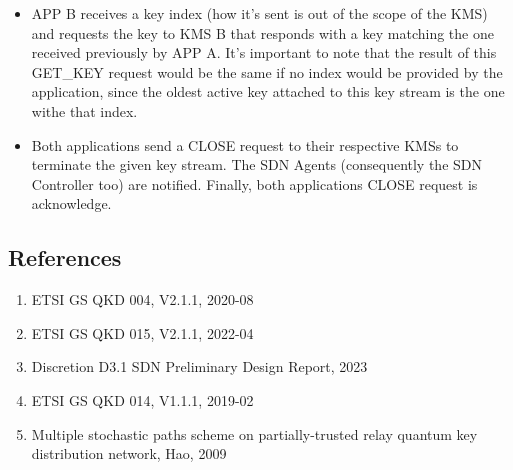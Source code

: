 \begin{refsection}
\begin{itemize}
 	\item APP B receives a key index (how it's sent is out of the scope of the \ac{KMS}) and requests the key to \ac{KMS} B that responds with a key matching the one received previously by APP A. It's important to note that the result of this GET\_KEY request would be the same if no index would be provided by the application, since the oldest active key attached to this key stream is the one withe that index.
 	\item Both applications send a CLOSE request to their respective \ac{KMS}s to terminate the given key stream. The SDN Agents (consequently the SDN Controller too) are notified. Finally, both applications CLOSE request is acknowledge.
 	
\end{itemize}

\pagebreak




\clearpage
\subsection{References}

\begin{enumerate}
	\item ETSI GS QKD 004, V2.1.1, 2020-08
	\item ETSI GS QKD 015, V2.1.1, 2022-04
	\item Discretion D3.1 SDN Preliminary Design Report, 2023
	\item ETSI GS QKD 014, V1.1.1, 2019-02
	\item Multiple stochastic paths scheme on partially-trusted relay quantum key distribution network, Hao, 2009
\end{enumerate}

\clearpage
\printbibliography[heading=subbibliography]
\end{refsection}
\cleardoublepage

